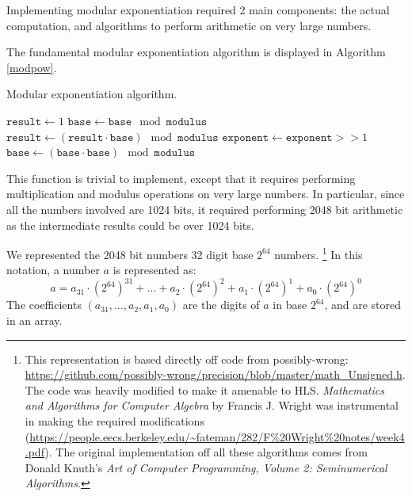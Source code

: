 Implementing modular exponentiation required 2 main components: the actual computation, and algorithms to perform
arithmetic on very large numbers.

The fundamental modular exponentiation algorithm is displayed in Algorithm \ref{modpow}.

\begin{algorithm}[!htb]
  \label{modpow}
  \caption[test]{Modular exponentiation algorithm.\footnotemark}
  \begin{algorithmic}
    \EndIf
    \State $\mathtt{result} \gets 1$
    \State $\mathtt{base} \gets \mathtt{base} \mod \mathtt{modulus}$
        \State $\mathtt{result} \gets (\mathtt{result} \cdot \mathtt{base}) \mod \mathtt{modulus}$
      \EndIf
      \State $\mathtt{exponent} \gets \mathtt{exponent} >> 1$
      \State $\mathtt{base} \gets (\mathtt{base} \cdot \mathtt{base}) \mod \mathtt{modulus}$
    \EndWhile
    \EndProcedure
  \end{algorithmic}
\end{algorithm}
  

This function is trivial to implement, except that it requires performing multiplication and modulus operations on very large numbers.
In particular, since all the numbers involved are 1024 bits, it required performing 2048 bit arithmetic as the intermediate results
could be over 1024 bits.

We represented the 2048 bit numbers 32 digit base $2^{64}$ numbers. \footnote{This representation is based directly off code from possibly-wrong: \url{https://github.com/possibly-wrong/precision/blob/master/math_Unsigned.h}. The code was heavily modified to make it amenable to HLS. \emph{Mathematics and Algorithms for Computer Algebra} by Francis J. Wright was instrumental in making the required modifications (\url{https://people.eecs.berkeley.edu/~fateman/282/F\%20Wright\%20notes/week4.pdf}). The original implementation off all these algorithms comes from Donald Knuth's \emph{Art of Computer Programming, Volume 2: Seminumerical Algorithms}.}
In this notation, a number $a$ is represented as:
$$a = a_{31} \cdot \left ( 2^{64} \right )^{31} + \ldots + a_{2} \cdot \left ( 2^{64} \right )^{2} + a_{1} \cdot \left ( 2^{64} \right )^{1} + a_{0} \cdot \left ( 2^{64} \right )^{0}$$
The coefficients $\left( a_{31}, \ldots, a_2, a_1, a_0 \right )$ are the digits of $a$ in base $2^{64}$, and are stored in an array.

